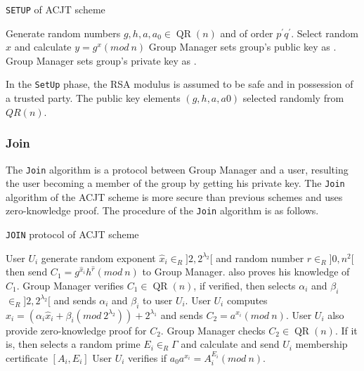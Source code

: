 \begin{algorithm}
\caption{\texttt{SETUP} of ACJT scheme}
\begin{algorithmic}[1]
\STATE Generate random numbers $g, h, a, a_0 \in \operatorname{QR}(n)$ and of order $p^\prime q^\prime$.
\STATE Select random $x$ and calculate $y = g^x (mod~n)$
\STATE Group Manager sets group's public key as .
\STATE Group Manager sets group's private key as .
\end{algorithmic}
\end{algorithm}

In the \texttt{SetUp} phase, the RSA modulus is assumed to be safe and in possession of a trusted party. The public key elements $(g, h, a, a0)$ selected randomly from $QR(n)$.

\subsubsection{Join}
The \texttt{Join} algorithm is a protocol between Group Manager and a user, resulting the user becoming a member of the group by getting his private key. The \texttt{Join} algorithm of the ACJT scheme is more secure than previous schemes and uses zero-knowledge proof. The procedure of the \texttt{Join} algorithm is as follows.

\begin{algorithm}
\caption{\texttt{JOIN} protocol of ACJT scheme}
\begin{algorithmic}[1]
\STATE User $U_i$ generate random exponent $\hat{x}_i \in_R ]2, 2^{\lambda_2}[$ and random number $\hat{r} \in_R ]0, n^2[$ then send $C_1 = g^{\hat{x}_i}h^{\hat{r}}(mod~n)$ to Group Manager. also proves his knowledge of $C_1$.
\STATE Group Manager verifies $C_1 \in \operatorname{QR}(n)$, if verified, then selects $\alpha_i$ and $\beta_i$ $\in_R ]2, 2^{\lambda_2}[$ and sends $\alpha_i$ and $\beta_i$ to user $U_i$.
\STATE User $U_i$ computes $x_i = ( \alpha_i \hat{x}_i + \beta_i (mod~2^{\lambda_2})) + 2^{\lambda_1} $ and sends $C_2 = a^{x_i}(mod~n)$. User $U_i$ also provide zero-knowledge proof for $C_2$.
\STATE Group Manager checks $C_2 \in \operatorname{QR}(n)$. If it is, then selects a random prime $E_i \in_R \Gamma$ and calculate
and send $U_i$ membership certificate $[A_i, E_i]$
\STATE User $U_i$ verifies if $a_0 a^{x_i} = A_i^{E_i} (mod~n)$.
\end{algorithmic}
\end{algorithm}

